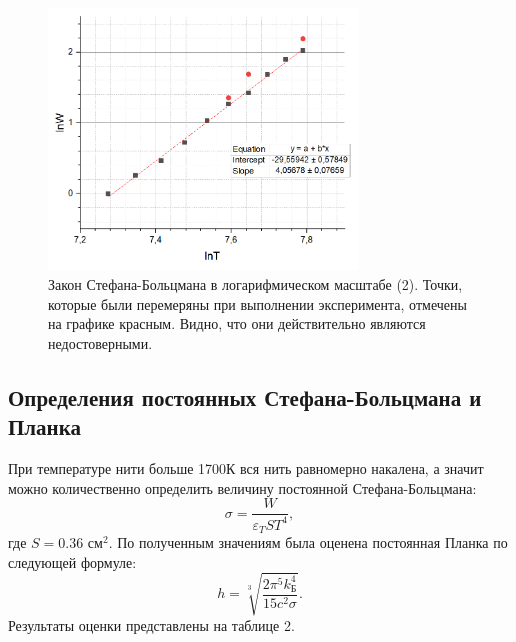 \documentclass[a4paper, 14pt]{extarticle}%
\newcommand\ECaption[1]{%
     \captionsetup{font=footnotesize}%
     \caption{#1}}
\begin{document}
\begin{figure}[H]
\begin{center}
\includegraphics[width=0.73\textwidth]{gr1}
\ECaption{Закон Стефана-Больцмана в логарифмическом масштабе (2). Точки, которые были перемеряны при выполнении эксперимента, отмечены на графике красным. Видно, что они действительно являются недостоверными.}
\end{center}
\end{figure}



\subsection*{Определения постоянных Стефана-Больцмана и Планка}

При температуре нити больше 1700К вся нить равномерно накалена, а значит можно количественно определить величину постоянной Стефана-Больцмана:
\begin{equation}
\sigma = \frac{W}{\varepsilon_T S T^4},
\end{equation}
где $S = 0.36 \text{ см}^2$. По полученным значениям была оценена постоянная Планка по следующей формуле:
\begin{equation}
h = \sqrt[3]{\frac{2\pi^5 k_{\text{Б}}^4}{15c^2\sigma}}.
\end{equation}
Результаты оценки представлены на таблице 2.
\end{document}
